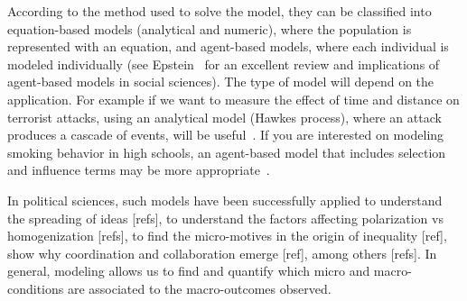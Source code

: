 According to the method used to solve the model, they can be classified into
equation-based models (analytical and numeric), where the population is represented with an equation,
and agent-based models, where each individual is modeled individually (see Epstein~\citep{Epstein2006} for an excellent review and implications of agent-based models in social sciences).
The type of model will depend on the application.
For example if we want to measure the effect of time and distance on terrorist attacks,
using an analytical model (Hawkes process), where an attack produces a cascade of events, will be useful~\citep{garciab2015}.
If you are interested on modeling smoking behavior in high schools,
an agent-based model that includes selection and influence terms may be more appropriate~\citep{Mercken2010}.


In political sciences, such models have been successfully applied to understand the spreading of ideas [refs], %
to understand the factors affecting polarization vs homogenization [refs],
to find the micro-motives in the origin of inequality [ref], 
show why coordination and collaboration emerge [ref],
among others [refs]. 
In general, modeling allows us to find and quantify which micro and macro-conditions are associated to the macro-outcomes observed.





